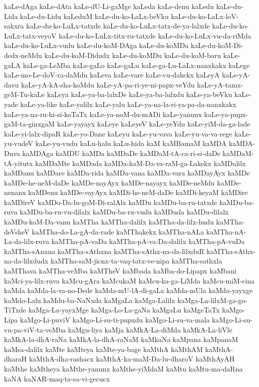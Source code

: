 {kaLe-dAga
kaLe-dAta
kaLe-dU-Li-gaMge
kaLeda
kaLe-denu
kaLedu
kaLe-du-Lida
kaLe-du-Lidu
kaLeduM
kaLe-du-ko-LaLx-beVku
kaLe-du-ko-LaLx-loV-sakxra
kaLe-du-ko-LuLx-tatxde
kaLe-du-ko-LuLx-tatx-de-ya-lalxde
kaLe-du-ko-LuLx-tatx-veyoV
kaLe-du-ko-LuLx-titx-ru-tatxde
kaLe-du-ko-LuLx-vu-da-riMda
kaLe-du-ko-LuLx-vudu
kaLe-du-koM-DAga
kaLe-du-koMDa
kaLe-du-koM-Di-dedx-neMdu
kaLe-du-koM-Didudx
kaLe-du-koMDu
kaLe-du-koM-baru
kaLe-gaLA
kaLe-ga-LeMba
kaLe-gaLo
kaLe-gaLu
kaLe-ga-Lu-LaLx-nanxkakx
kaLege
kaLe-mo-Le-doV-ra-daMdu
kaLeva
kaLe-vare
kaLe-vu-dakekx
kaLeyA
kaLe-yA-davu
kaLe-yA-kA-sha-koMdu
kaLe-yA-pa-ri-ye-ni-papx-veYdu
kaLe-yA-tamx-geM-Tu-kaLe
kaLeya
kaLe-ya-ba-lalxDe
kaLe-ya-ba-lulxdu
kaLe-ya-beVku
kaLe-yade
kaLe-ya-like
kaLe-yalilx
kaLe-yalu
kaLe-ya-na-la-ri-ya-pa-da-nanxkakx
kaLe-ya-na-ru-hi-si-koTaTx
kaLe-ya-noM-du-mADi
kaLe-yanunx
kaLe-ya-pupx-gaM-ta-ginxgaM
kaLe-yayayx
kaLeye
kaLeyeV
kaLe-yeYdu
kaLe-yiM-da-ga-lade
kaLe-yi-lalx-dipaR
kaLe-yo-Dane
kaLeyu
kaLe-yu-vava
kaLe-yu-va-va-rege
kaLe-yu-vudeV
kaLe-yu-vudu
kaLu-halu
kaLu-hida
kaM
kaMBamaM
kaMDA
kaMDA-Duva
kaMDAga
kaMDU
kaMDa
kaMDaDe
kaMDaM-tA-ca-ri-si-daDe
kaMDaM-tA-yitutx
kaMDaMte
kaMDada
kaMDa-kaM-Da-va-raM-ga-Lakekx
kaMDalilx
kaMDanu
kaMDare
kaMDa-rida
kaMDa-vana
kaMDa-vara
kaMDayAyx
kaMDe
kaMDe-he-neM-daDe
kaMDe-nayAyx
kaMDe-nayayx
kaMDe-neMdu
kaMDe-nenanx
kaMDenu
kaMDe-vayAyx
kaMDi-he-neM-daDe
kaMDi-keyaM
kaMDire
kaMDireV
kaMDo-Da-lu-goM-Di-ralAlx
kaMDu
kaMDu-ba-ru-tatxde
kaMDu-ba-ruva
kaMDu-ba-ru-vu-dilalx
kaMDu-ba-ru-vudu
kaMDuda
kaMDu-dilalx
kaMDu-koM-Da-vanu
kaMTha
kaMTha-dalilx
kaMTha-da-lilx-hudu
kaMTha-deVsheV
kaMTha-do-La-gA-da-rade
kaMThakekx
kaMTha-nALa
kaMTha-nA-La-da-lilx-ruva
kaMTha-pA-vaDa
kaMTha-pA-va-Da-dalilx
kaMTha-pA-vuDa
kaMTha-sAnxna
kaMTha-sAthxna
kaMTha-sAthx-na-da-lilxduR
kaMTha-sAthx-na-da-lilxdudx
kaMTha-saM-jicnx-ta-vaq-tatx-ve-nipa
kaMTha-sathxla
kaMThava
kaMTha-veMba
kaMTheV
kaMbada
kaMba-do-Lipapx
kaMbani
kaMci-ya-lilx-ruva
kaMcu-gAra
kaMcukaM
kaMcu-ka-ga-LiMda
kaMcu-miM-cina
kaMda
kaMda-la-va-no-Dede
kaMda-mU-lA-di-gaLa
kaMda-mUla
kaMda-yayxge
kaMdo-Lalu
kaMdu-ba-NaNxda
kaMgaLa
kaMga-Lalilx
kaMga-La-lilxM-ga-go-TiTxde
kaMga-La-yayxMge
kaMga-Lo-La-gaNa
kaMgaLu
kaMgeTaTx
kaMgo-Lipa
kaMgo-Li-puviV
kaMgo-Li-su-ti-pupxdu
kaMgo-Li-su-va-mala
kaMgo-Li-su-vu-pa-viV-ta-veMba
kaMgu-liya
kaMja
kaMkA-La-diMda
kaMkA-La-liVle
kaMkA-la-dhA-raNa
kaMkA-la-dhA-raNaM
kaMkaNa
kaMpana
kaMpanaM
kaMsa-dalilx
kaMte
kaMteya
kaMte-ya-bage
kaMthA
kaMthAM
kaMthA-dharaH
kaMthA-dha-rashacx
kaMthA-ka-maM-Da-lu-dharoV
kaMthAyAH
kaMthe
kaMtheya
kaMthe-yanunx
kaMthe-yiMdaM
kaMtu
kaMtu-ma-daRna
kaNA
kaNAR-maq-ta-sa-vi-gecucx
}
